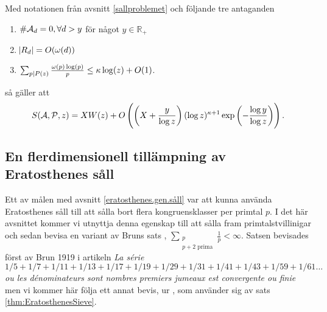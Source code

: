 \begin{theorem}\label{thm:EratosthenesSieve}
Med notationen från avsnitt \ref{sallproblemet} och följande tre antaganden 
\begin{enumerate}
    \item \(\card{\A_d} = 0, \forall d > y\) för något \(y \in \mathbb{R}_+\)
    \item \(\abs{R_d} = O(\omega(d))\)
    \item \(\sum_{p \divides P(z)} \frac{\omega(p) \log(p)}{p} \leq \kappa \log(z) + O(1)\).
\end{enumerate}
så gäller att
\begin{align*}
    \S{A}{P}{z} = X W(z) + O\left(\left(X + \frac{y}{\log z} \right) (\log z)^{\kappa + 1} \exp{\left(-\frac{\log y}{\log z}\right)} \right). 
\end{align*}

\end{theorem}
    

\subsection{En flerdimensionell tillämpning av Eratosthenes såll}\label{eratosthenes.tillämpning}

Ett av målen med avsnitt \ref{eratosthenes.gen.såll} var att kunna använda Eratosthenes såll till att sålla bort flera kongruensklasser per primtal $p$. I det här avsnittet kommer vi utnyttja denna egenskap till att sålla fram primtalstvillinigar och sedan bevisa en variant av Bruns sats \cite[Korollarium 5.4.5]{cojocarumurty}, \(\sum_{\substack{p \\ p + 2 \text{ prima}}} \frac{1}{p} < \infty\). Satsen bevisades först av Brun 1919 i artikeln \textit{La série} \(1/5 + 1/7 + 1/11 + 1/13 + 1/17 + 1/19 + 1/29 + 1/31 + 1/41 + 1/43 + 1/59 + 1/61 \dots\) \textit{ou les dénominateurs sont \guillemotleft nombres premiers jumeaux \guillemotright est convergente ou finie} men vi kommer här följa ett annat bevis, ur \cite[s.72-73]{cojocarumurty}, som använder sig av sats \ref{thm:EratosthenesSieve}.

